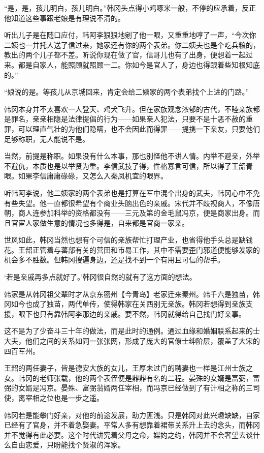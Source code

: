 “是，是，孩儿明白，孩儿明白。”韩冈头点得小鸡啄米一般，不停的应承着，反正他知道这些事跟老娘是有理说不清的。

听出儿子是在随口应付，韩阿李狠狠地剜了他一眼，又重重地哼了一声，“今次你二姨也一并托人送了信过来，她家还有你的两个表弟。你二姨夫也是个吃兵粮的，教出的两个儿子都不差。听说你现在做了官，信哥儿也有了出身，便想着一起过来。都是自家人，能照顾就照顾一二。你如今是官人了，身边也得跟着些知根知底的。”

“娘说的是。等孩儿从京城回来，肯定会给二姨家的两个表弟找个上进的门路。”

韩冈本身并不太喜欢一人登天、鸡犬飞升。但在家族观念浓郁的古代，不睦亲族都是罪名，亲亲相隐是法律提倡的行为——如果亲人犯法，只要不是十恶不赦的重罪，可以理直气壮的为他们隐瞒，也不会因此而得罪——提携一下亲友，只要他们足够称职，无人能说不是。

当然，前提是称职。如果没有什么本事，那也别怪他不讲人情。内举不避亲，外举不避仇，本质也是以举贤为重。李信武技了得，性格寡言可信，所以得了王韶青眼。如果李信庸庸碌碌，又怎么入秦凤机宜的眼界。

听韩阿李说，他二姨家的两个表弟也是打算在军中混个出身的武夫，韩冈心中不免有些失望。他一直都很希望有个商业头脑出色的亲戚。宋代并不歧视商人，不像唐朝，商人连参加科举的资格都没有——三元及第的金毛鼠冯京，便是商家出身。而且官宦人家做生意的情况也多得是，自来都是官商一家亲。

世风如此，韩冈当然也想有个可信的亲族帮忙打理产业，也省得他手头总是缺钱花。王韶正管着与蕃部有关的营田和市易工作，其中不需要歪门邪道便能够发家的机会多不胜数。但韩冈搜遍身边，还是找不到一个有用且可信的帮手。

‘若是亲戚再多点就好了。’韩冈很自然的就有了这方面的想法。

韩家是从韩冈祖父辈时才从京东密州【今青岛】老家迁来秦州。韩千六是独苗，韩冈如今也成了独苗，两代单传，使得韩家在关西别无亲族。韩冈若想得到亲族支援，眼下也只有靠韩阿李那边的亲戚。要不然，韩冈就得给自己找门好亲事。

这不是为了少奋斗三十年的做法，而是此时的通例。通过血缘和婚姻联系起来的士大夫，他们之间的关系如同一张张网，形成了庞大的官僚士绅阶层，覆盖了大宋的四百军州。

王韶的两任妻子，皆是德安大族的女儿，王厚未过门的聘妻也一样是江州士族之女。韩冈的老师张载，他的两个表侄便是鼎鼎有名的二程。晏殊的女婿是富弼，富弼的女婿是冯京。晏殊、富弼翁婿两任宰相，而冯京已经做到了有计相之称的三司使，离宰相之位也是一步之遥。

韩冈若是能攀门好亲，对他的前途发展，助力匪浅。只是韩冈对此兴趣缺缺，自家已经有了官身，并不着急娶妻。平常人多有想靠着裙带关系升上去的念头，而韩冈并不觉得有此必要。这个时代讲究着父母之命，媒妁之约，韩冈并不会奢望去谈什么自由恋爱，只盼能找个贤淑的浑家。

